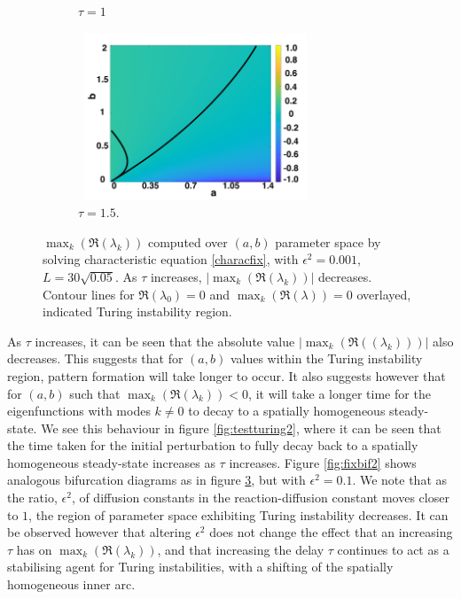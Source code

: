 \begin{figure}[H]
\begin{subfigure}[b]{0.45\textwidth}
        \caption{$\tau=1$}
        \label{}
    \end{subfigure}
    \hfill
    \begin{subfigure}[b]{0.45\textwidth}
        \centering
        \includegraphics[width=7cm,height=5cm]{tau15bif.png}
        \caption{$\tau=1.5$.}
        \label{}
    \end{subfigure}
    \caption{$\max_k(\Re(\lambda_k))$ computed over $(a,b)$ parameter space by solving characteristic equation \eqref{characfix}, with $\epsilon^2=0.001$, $L=30\sqrt{0.05}$. As $\tau$ increases, $|\max_k(\Re(\lambda_k))|$ decreases. Contour lines for $\Re(\lambda_0)=0$ and $\max_k(\Re(\lambda))=0$ overlayed, indicated Turing instability region.}
    \label{fig:lambdavary}
\end{figure}
As $\tau$ increases, it can be seen that the absolute value $|\max_k(\Re((\lambda_k)))|$ also decreases. This suggests that for $(a,b)$ values within the Turing instability region, pattern formation will take longer to occur. It also suggests however that for $(a,b)$ such that $\max_k(\Re(\lambda_k))<0$, it will take a longer time for the eigenfunctions with modes $k\neq0$ to decay to a spatially homogeneous steady-state. We see this behaviour in figure \ref{fig:testturing2}, where it can be seen that the time taken for the initial perturbation to fully decay back to a spatially homogeneous steady-state increases as $\tau$ increases. Figure \ref{fig:fixbif2} shows analogous bifurcation diagrams as in figure \ref{fig:lambdavary}, but with $\epsilon^2=0.1$. We note that as the ratio, $\epsilon^2$, of diffusion constants in the reaction-diffusion constant moves closer to $1$, the region of parameter space exhibiting Turing instability decreases. It can be observed however that altering $\epsilon^2$ does not change the effect that an increasing $\tau$ has on $\max_k(\Re(\lambda_k))$, and that increasing the delay $\tau$ continues to act as a stabilising agent for Turing instabilities, with a shifting of the spatially homogeneous inner arc.

